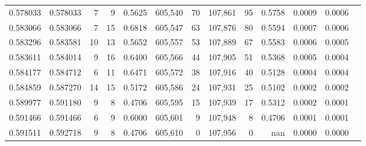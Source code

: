 \begin{tabular}{rrrrrrrrrrrrr}
0.578033 & 0.578033 &     7 &     9 &                                     0.5625 & 605,540 &      70 & 107,861 &      95 & 0.5758 & 0.0009 & 0.0006 \\
0.583066 & 0.583066 &     7 &    15 &                                     0.6818 & 605,547 &      63 & 107,876 &      80 & 0.5594 & 0.0007 & 0.0006 \\
0.583296 & 0.583581 &    10 &    13 &                                     0.5652 & 605,557 &      53 & 107,889 &      67 & 0.5583 & 0.0006 & 0.0005 \\
0.583611 & 0.584014 &     9 &    16 &                                     0.6400 & 605,566 &      44 & 107,905 &      51 & 0.5368 & 0.0005 & 0.0004 \\
0.584177 & 0.584712 &     6 &    11 &                                     0.6471 & 605,572 &      38 & 107,916 &      40 & 0.5128 & 0.0004 & 0.0004 \\
0.584859 & 0.587270 &    14 &    15 &                                     0.5172 & 605,586 &      24 & 107,931 &      25 & 0.5102 & 0.0002 & 0.0002 \\
0.589977 & 0.591180 &     9 &     8 &                                     0.4706 & 605,595 &      15 & 107,939 &      17 & 0.5312 & 0.0002 & 0.0001 \\
0.591466 & 0.591466 &     6 &     9 &                                     0.6000 & 605,601 &       9 & 107,948 &       8 & 0.4706 & 0.0001 & 0.0001 \\
0.591511 & 0.592718 &     9 &     8 &                                     0.4706 & 605,610 &       0 & 107,956 &       0 &    nan & 0.0000 & 0.0000 \\
\bottomrule
\end{tabular}
